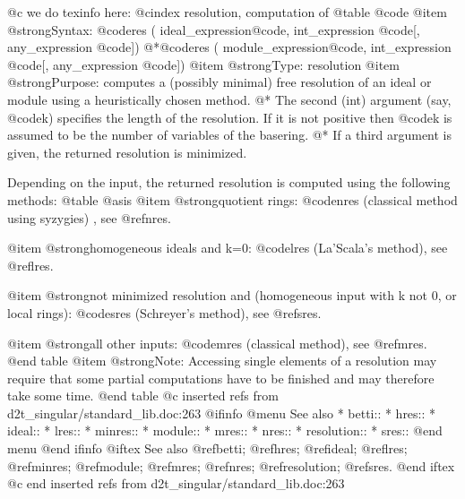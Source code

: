 @c we do texinfo here:
@cindex resolution, computation of
@table @code
@item @strong{Syntax:}
@code{res (} ideal_expression@code{,} int_expression @code{[,} any_expression @code{])}
@*@code{res (} module_expression@code{,} int_expression @code{[,} any_expression @code{])}
@item @strong{Type:}
resolution
@item @strong{Purpose:}
computes a (possibly minimal) free resolution of an ideal or module using
a heuristically chosen method.
@* The second (int) argument (say, @code{k}) specifies the length of
the resolution. If it is not positive then @code{k} is assumed to be the
number of variables of the basering.
@* If a third argument is given, the returned resolution is minimized.

Depending on the input, the returned resolution is computed using the
following methods:
@table @asis
@item @strong{quotient rings:}
@code{nres} (classical method using syzygies) , see @ref{nres}.

@item @strong{homogeneous ideals and k=0:}
@code{lres} (La'Scala's method), see @ref{lres}.

@item @strong{not minimized resolution and (homogeneous input with k not 0, or local rings):}
@code{sres} (Schreyer's method), see @ref{sres}.

@item @strong{all other inputs:}
@code{mres} (classical method), see @ref{mres}.
@end table
@item @strong{Note:}
Accessing single elements of a resolution may require that some partial
computations have to be finished and may therefore take some time.
@end table
@c inserted refs from d2t_singular/standard_lib.doc:263
@ifinfo
@menu
See also
* betti::
* hres::
* ideal::
* lres::
* minres::
* module::
* mres::
* nres::
* resolution::
* sres::
@end menu
@end ifinfo
@iftex
See also
@ref{betti};
@ref{hres};
@ref{ideal};
@ref{lres};
@ref{minres};
@ref{module};
@ref{mres};
@ref{nres};
@ref{resolution};
@ref{sres}.
@end iftex
@c end inserted refs from d2t_singular/standard_lib.doc:263

